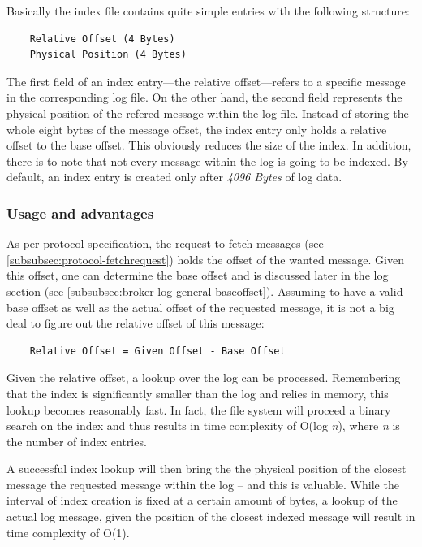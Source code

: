 Basically the index file contains quite simple entries with the following
structure: 
\begin{verbatim}
    Relative Offset (4 Bytes)
    Physical Position (4 Bytes)
\end{verbatim}

The first field of an index entry---the relative offset---refers to a specific
message in the corresponding log file. On the other hand, the second field
represents the physical position of the refered message within the log file.
Instead of storing the whole eight bytes of the message offset, the index entry
only holds a relative offset to the base offset. This obviously reduces the
size of the index. In addition, there is to note that not every message within
the log is going to be indexed. By default, an index entry is created only after
\textit{4096 Bytes} of log data.

\subsubsection{Usage and advantages}

As per protocol specification, the request to fetch messages (see
\ref{subsubsec:protocol-fetchrequest}) holds the offset of the wanted message.
Given this offset, one can determine the base offset and is discussed later
in the log section (see \ref{subsubsec:broker-log-general-baseoffset}).
Assuming to have a valid base offset as well as the actual offset of the
requested message, it is not a big deal to figure out the relative offset of
this message:

\begin{verbatim}
    Relative Offset = Given Offset - Base Offset
\end{verbatim}

Given the relative offset, a lookup over the log can be processed. Remembering
that the index is significantly smaller than the log and relies in memory, this
lookup becomes reasonably fast. In fact, the file system will proceed a binary
search on the index and thus results in time complexity of O(log \textit{n}), where
\textit{n} is the number of index entries.

A successful index lookup will then bring the the physical position of
the closest message the requested message within the log -- and this is valuable. While
the interval of index creation is fixed at a certain amount of bytes, a lookup
of the actual log message, given the position of the closest indexed message
will result in time complexity of O(1).

